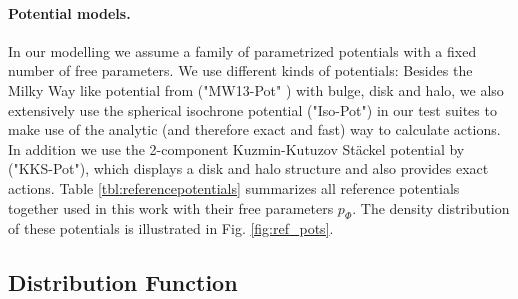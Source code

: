 \paragraph{Potential models.} In our modelling we assume a family of parametrized potentials with a fixed number of free parameters. We use different kinds of potentials: Besides the Milky Way like potential from \citet{bov13} ("MW13-Pot" ) with bulge, disk and halo, we also extensively use the spherical isochrone potential ("Iso-Pot") in our test suites to make use of the analytic (and therefore exact and fast) way  to calculate actions. In addition we use the 2-component Kuzmin-Kutuzov St\"{a}ckel potential by \citet{bat94} ("KKS-Pot"), which displays a disk and halo structure and also provides exact actions. Table \ref{tbl:referencepotentials} summarizes all reference potentials together used in this work with their free parameters $p_\Phi$. The density distribution of these potentials is illustrated in Fig. \ref{fig:ref_pots}.






\begin{figure*}
\caption{Density distribution of the four reference galaxy potentials in Table \ref{tbl:referencepotentials}, for illustration purposes. These potentials are used throughout this work for mock data creation and potential recovery. [TO DO: Halo sichtbarer machen, evtl. mit isodensity contours]}
\label{fig:ref_pots}
\end{figure*}


\subsection{Distribution Function} \label{sec:qDF}

